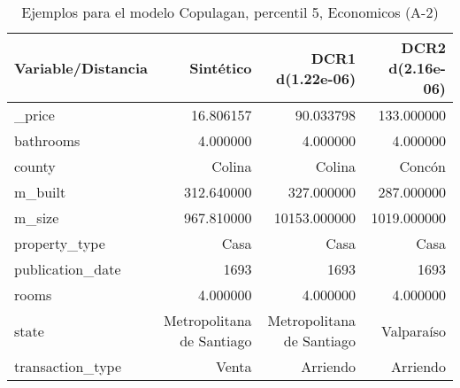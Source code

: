 \begin{table}[H]
\centering
\fontsize{10}{14}\selectfont
\caption{Ejemplos para el modelo Copulagan, percentil 5, Economicos (A-2)}
\label{table-example-economicos-a-2-copulagan-5p}
\begin{tabular}{|l|r|r|r|}
\hline
\rowcolor[gray]{0.8}
Variable/Distancia & Sintético & DCR1 d(1.22e-06) & DCR2 d(2.16e-06) \\
\hline \_price & \cellcolor[rgb]{0.9, 0.54, 0.52} 16.806157 & 90.033798 & 133.000000 \\
\hline bathrooms & \cellcolor[rgb]{0.9, 0.54, 0.52} 4.000000 & \cellcolor[rgb]{0.9, 0.54, 0.52} 4.000000 & \cellcolor[rgb]{0.9, 0.54, 0.52} 4.000000 \\
\hline county & \cellcolor[rgb]{0.9, 0.54, 0.52} Colina & \cellcolor[rgb]{0.9, 0.54, 0.52} Colina & Concón \\
\hline m\_built & \cellcolor[rgb]{0.9, 0.54, 0.52} 312.640000 & 327.000000 & 287.000000 \\
\hline m\_size & \cellcolor[rgb]{0.9, 0.54, 0.52} 967.810000 & 10153.000000 & 1019.000000 \\
\hline property\_type & \cellcolor[rgb]{0.9, 0.54, 0.52} Casa & \cellcolor[rgb]{0.9, 0.54, 0.52} Casa & \cellcolor[rgb]{0.9, 0.54, 0.52} Casa \\
\hline publication\_date & \cellcolor[rgb]{0.9, 0.54, 0.52} 1693 & \cellcolor[rgb]{0.9, 0.54, 0.52} 1693 & \cellcolor[rgb]{0.9, 0.54, 0.52} 1693 \\
\hline rooms & \cellcolor[rgb]{0.9, 0.54, 0.52} 4.000000 & \cellcolor[rgb]{0.9, 0.54, 0.52} 4.000000 & \cellcolor[rgb]{0.9, 0.54, 0.52} 4.000000 \\
\hline state & \cellcolor[rgb]{0.9, 0.54, 0.52} Metropolitana de Santiago & \cellcolor[rgb]{0.9, 0.54, 0.52} Metropolitana de Santiago & Valparaíso \\
\hline transaction\_type & \cellcolor[rgb]{0.9, 0.54, 0.52} Venta & Arriendo & Arriendo \\
\hline
\end{tabular}
\end{table}
